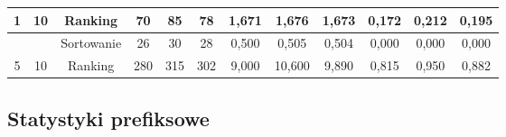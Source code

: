 \documentclass[licencjacka]{pracamgr}
\begin{document}
\begin{table}[H]
{\begin{tabular}{@{}cccccccccccc@{}}
1                                                               & 10                                                      & Ranking    & 70                                                      & 85                                                      & 78                                                         & 1,671                                                      & 1,676                                                      & 1,673                                                          & 0,172                                                              & 0,212                                                               & 0,195                                                                  \\ \midrule
                                                                &                                                         & Sortowanie & 26                                                      & 30                                                      & 28                                                         & 0,500                                                      & 0,505                                                      & 0,504                                                          & 0,000                                                              & 0,000                                                               & 0,000                                                                  \\
5                                                               & 10                                                      & Ranking    & 280                                                     & 315                                                     & 302                                                        & 9,000                                                      & 10,600                                                     & 9,890                                                          & 0,815                                                              & 0,950                                                               & 0,882                                                                  \\ \bottomrule
\end{tabular}%
}
\end{table}

\subsection{Statystyki prefiksowe}
\end{document}
